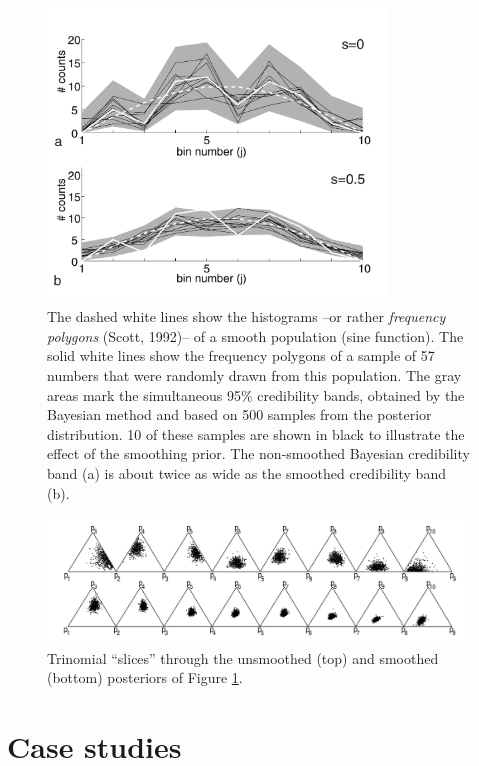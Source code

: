 \documentclass{article}
\begin{document}
\begin{figure}[here]
  \centering \includegraphics[width=9cm]{14.pdf}
  \caption{
The dashed white lines show  the histograms --or rather {\it frequency
polygons} (Scott, 1992)-- of a smooth population (sine function).  The
solid  white lines  show  the frequency  polygons  of a  sample of  57
numbers that were randomly drawn from this population.  The gray areas
mark the simultaneous 95\% credibility bands, obtained by the Bayesian
method and based  on 500 samples from the  posterior distribution.  10
of these  samples are shown in  black to illustrate the  effect of the
smoothing prior.   The non-smoothed  Bayesian credibility band  (a) is
about twice as wide as the smoothed credibility band (b).}
  \label{fig:sineSmooth}
\end{figure}

\begin{figure}[here]
  \centering
  \includegraphics[width=\textwidth]{14a+b.pdf}
  \caption{Trinomial ``slices'' through the unsmoothed (top) and smoothed 
(bottom) posteriors of Figure \ref{fig:sineSmooth}.
}
  \label{fig:triangleseries}
\end{figure}

\clearpage 

\section{Case studies} \label{sec:examplesRevisited}
\end{document}
